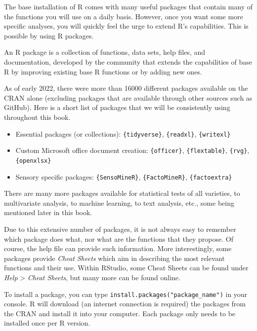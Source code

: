 \documentclass[
]{krantz}
\providecommand{\tightlist}{%
  \setlength{\itemsep}{0pt}\setlength{\parskip}{0pt}}
\renewenvironment{quote}{\begin{VF}}{\end{VF}}
\begin{document}
The base installation of R comes with many useful packages that contain many of the functions you will use on a daily basis. However, once you want some more specific analyses, you will quickly feel the urge to extend R's capabilities. This is possible by using R packages.

An R package is a collection of functions, data sets, help files, and documentation, developed by the community that extends the capabilities of base R by improving existing base R functions or by adding new ones.

As of early 2022, there were more than 16000 different packages available on the CRAN alone (excluding packages that are available through other sources such as GitHub). Here is a short list of packages that we will be consistently using throughout this book.

\begin{itemize}
\tightlist
\item
  Essential packages (or collections): \texttt{\{tidyverse\}}, \texttt{\{readxl\}}, \texttt{\{writexl\}}
\item
  Custom Microsoft office document creation: \texttt{\{officer\}}, \texttt{\{flextable\}}, \texttt{\{rvg\}}, \texttt{\{openxlsx\}}
\item
  Sensory specific packages: \texttt{\{SensoMineR\}}, \texttt{\{FactoMineR\}}, \texttt{\{factoextra\}}
\end{itemize}

There are many more packages available for statistical tests of all varieties, to multivariate analysis, to machine learning, to text analysis, etc., some being mentioned later in this book.

\begin{quote}
Due to this extensive number of packages, it is not always easy to remember which package does what, nor what are the functions that they propose. Of course, the help file can provide such information. More interestingly, some packages provide \emph{Cheat Sheets} which aim in describing the most relevant functions and their use. Within RStudio, some Cheat Sheets can be found under \emph{Help} \textgreater{} \emph{Cheat Sheets}, but many more can be found online.
\end{quote}

To install a package, you can type \texttt{install.packages("package\_name")} in your console. R will download (an internet connection is required) the packages from the CRAN and install it into your computer. Each package only needs to be installed once per R version.
\end{document}
